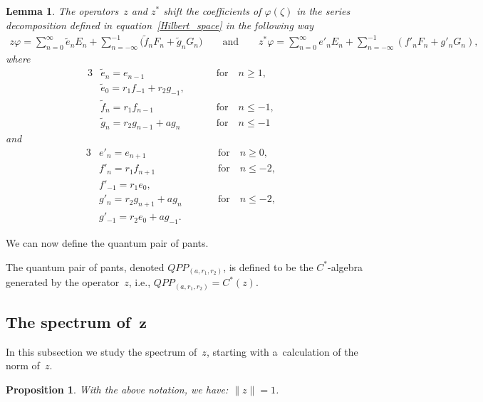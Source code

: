 \documentclass[pdftex]{sigma}
\numberwithin{equation}{section}
\newtheorem{Lemma}[Theorem]{Lemma}
\newtheorem{Proposition}[Theorem]{Proposition}
{ \theoremstyle{definition}
\newtheorem{Definition}[Theorem]{Definition}
\newtheorem{Remark}[Theorem]{Remark} }
\begin{document}
\begin{Lemma}
\label{z_z_star_coefficients}
The operators~$z$ and $z^*$ shift the coefficients of $\varphi(\zeta)$ in the series decomposition defined in
equation~\eqref{Hilbert_space} in the following way
\begin{gather*}
z\varphi=\sum\limits_{n=0}^\infty\tilde{e}_nE_n+\sum\limits_{n=-\infty}^{-1}\!\! \big(\tilde{f}_nF_n+\tilde{g}_nG_n\big)
\qquad
\text{and}
\qquad
z^*\varphi=\sum\limits_{n=0}^\infty e'_nE_n+\sum\limits_{n=-\infty}^{-1}\!\! (f'_nF_n+g'_nG_n),
\end{gather*}
where
\begin{alignat*}{3}
& \tilde{e}_n=e_{n-1} \qquad && \text{for} \quad n\ge 1, &
\\
& \tilde{e}_0=r_1f_{-1}+r_2g_{-1}, &&&
\\
& \tilde{f}_n=r_1f_{n-1} \qquad && \text{for} \quad n\le -1,&
\\
& \tilde{g}_n=r_2g_{n-1}+ag_n \qquad && \text{for} \quad n\le -1 &
\end{alignat*}
and
\begin{alignat*}{3}
& e'_n=e_{n+1} \qquad && \text{for} \quad n\ge 0, &
\\
& f'_n=r_1f_{n+1} \qquad && \text{for} \quad n\le -2, &
\\
& f'_{-1}=r_1e_0, &&&
\\
& g'_n=r_2g_{n+1}+ag_n \qquad && \text{for} \quad n\le -2,&
\\
& g'_{-1}=r_2e_0+ag_{-1}. &&&
\end{alignat*}
\end{Lemma}
We can now def\/ine the quantum pair of pants.

\begin{Definition}
The quantum pair of pants, denoted $QPP_{(a, r_1,r_2)}$, is def\/ined to be the $C^*$-algebra generated by the
operator~$z$,
i.e., $QPP_{(a, r_1,r_2)}=C^*(z)$.
\end{Definition}

\subsection[The spectrum of~$z$]{The spectrum of~$\boldsymbol{z}$}

In this subsection we study the spectrum of~$z$, starting with a~calculation of the norm of~$z$.

\begin{Proposition}
\label{norm_of_z}
With the above notation, we have: $\|z\|=1$.
\end{Proposition}
\end{document}
